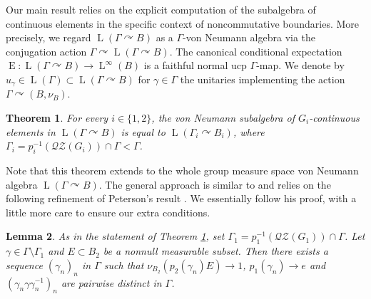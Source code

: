 \documentclass[11pt]{article}
\newtheorem{thm}{Theorem}[section]
\newtheorem{lem}[thm]{Lemma}
\theoremstyle{definition}
\DeclareMathOperator{\rE}{ E}
\DeclareMathOperator{\rL}{L}
\begin{document}
Our main result relies on the explicit computation of the subalgebra of continuous elements in the specific context of noncommutative boundaries. More precisely, we regard $\rL(\Gamma \curvearrowright B)$ as a $\Gamma$-von Neumann algebra via the conjugation action $\Gamma \curvearrowright \rL(\Gamma \curvearrowright B)$. The canonical conditional expectation $\rE : \rL(\Gamma \curvearrowright B) \to \rL^\infty(B)$ is a faithful normal ucp $\Gamma$-map. We denote by $u_\gamma \in \rL(\Gamma) \subset \rL(\Gamma \curvearrowright B)$ for $\gamma \in \Gamma$ the unitaries implementing the action $\Gamma \curvearrowright (B, \nu_B)$.

\begin{thm}\label{thm-continuous}
For every $i \in \{1, 2\}$, the von Neumann subalgebra of $G_i$-continuous elements in $\rL(\Gamma \curvearrowright B)$ is equal to $\rL(\Gamma_i \curvearrowright B_i)$, where $\Gamma_i = p_i^{-1}(\mathscr{Q}\mathscr{Z}(G_i)) \cap \Gamma < \Gamma$.
\end{thm}

Note that this theorem extends \cite[Lem.\,5.4]{BBHP20} to the whole group measure space von Neumann algebra $\rL(\Gamma \curvearrowright B)$. The general approach is similar to \cite[Lem.\,5.4]{BBHP20} and relies on the following refinement of Peterson's result \cite[Lem.\,5.1]{Pe14}. We essentially follow his proof, with a little more care to ensure our extra conditions.

\begin{lem}\label{lem-sequence}
As in the statement of Theorem \ref{thm-continuous}, set $\Gamma_1 = p_1^{-1}(\mathscr{Q}\mathscr{Z}(G_1)) \cap \Gamma$.
Let $\gamma \in \Gamma \setminus \Gamma_1$ and $E \subset B_2$ be a nonnull measurable subset. Then there exists a sequence $(\gamma_n)_{n}$ in $\Gamma$ such that $\nu_{B_2}(p_2(\gamma_n) E) \to 1$, $p_1(\gamma_n) \to e$ and $(\gamma_n \gamma \gamma_n^{-1})_{n}$ are pairwise distinct in $\Gamma$.
\end{lem}
\end{document}
